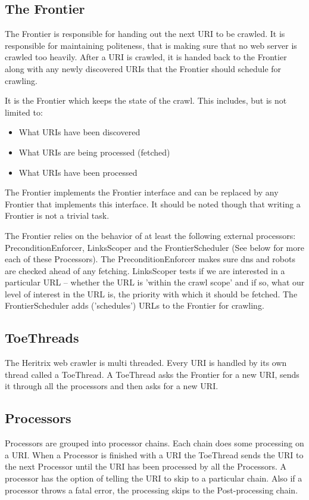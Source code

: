 \documentclass[11pt,a4paper]{article}
\begin{document}
\subsection{The Frontier}
The Frontier is responsible for handing out the next URI to be crawled. It is responsible for maintaining politeness, that is making sure that no web server is crawled too heavily. After a URI is crawled, it is handed back to the Frontier along with any newly discovered URIs that the Frontier should schedule for crawling.

It is the Frontier which keeps the state of the crawl. This includes, but is not limited to:

\begin{itemize}
\item What URIs have been discovered
\item What URIs are being processed (fetched)
\item What URIs have been processed
\end{itemize}

The Frontier implements the Frontier interface and can be replaced by any Frontier that implements this interface. It should be noted though that writing a Frontier is not a trivial task.

The Frontier relies on the behavior of at least the following external processors: PreconditionEnforcer, LinksScoper and the FrontierScheduler (See below for more each of these Processors). The PreconditionEnforcer makes sure dns and robots are checked ahead of any fetching. LinksScoper tests if we are interested in a particular URL -- whether the URL is 'within the crawl scope' and if so, what our level of interest in the URL is, the priority with which it should be fetched. The FrontierScheduler adds ('schedules') URLs to the Frontier for crawling.

\subsection{ToeThreads}
The Heritrix web crawler is multi threaded. Every URI is handled by its own thread called a ToeThread. A ToeThread asks the Frontier for a new URI, sends it through all the processors and then asks for a new URI.

\subsection{Processors}
Processors are grouped into processor chains. Each chain does some processing on a URI. When a Processor is finished with a URI the ToeThread sends the URI to the next Processor until the URI has been processed by all the Processors. A processor has the option of telling the URI to skip to a particular chain. Also if a processor throws a fatal error, the processing skips to the Post-processing chain.
\end{document}
